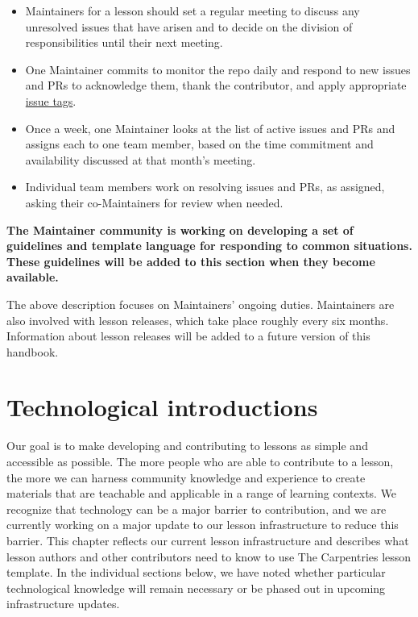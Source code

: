 \documentclass[]{book}
\providecommand{\tightlist}{%
  \setlength{\itemsep}{0pt}\setlength{\parskip}{0pt}}
\begin{document}
\begin{itemize}
\tightlist
\item
  Maintainers for a lesson should set a regular meeting to discuss any unresolved issues that have arisen and to decide on the division of responsibilities until
  their next meeting.\\
\item
  One Maintainer commits to monitor the repo daily and respond to new issues and PRs to acknowledge them,
  thank the contributor, and apply appropriate \href{https://docs.carpentries.org/topic_folders/maintainers/github_labels.html}{issue tags}.\\
\item
  Once a week, one Maintainer looks at the list of active issues and PRs and assigns each to one team member, based on the time commitment and availability discussed at that month's meeting.\\
\item
  Individual team members work on resolving issues and PRs, as assigned, asking
  their co-Maintainers for review when needed.
\end{itemize}

\textbf{The Maintainer community is working on developing a set of guidelines and template
language for responding to common situations. These guidelines will be added
to this section when they become available.}

The above description focuses on Maintainers' ongoing duties. Maintainers are
also involved with lesson releases, which take place roughly every six months.
Information about lesson releases will be added to a future version of this
handbook.

\hypertarget{technological-introductions}{%
\chapter{Technological introductions}\label{technological-introductions}}

Our goal is to make
developing and contributing to lessons as simple and accessible
as possible. The more people who are able to contribute to a
lesson, the more we can harness community knowledge and
experience to create materials that are teachable and applicable
in a range of learning contexts. We recognize that technology
can be a major barrier to contribution, and we are currently
working on a major update to our lesson infrastructure to reduce
this barrier. This chapter reflects our current lesson
infrastructure and describes what lesson authors and other
contributors need to know to use The Carpentries lesson template.
In the individual sections below, we have noted whether particular
technological knowledge will remain necessary or be phased out
in upcoming infrastructure updates.
\end{document}
